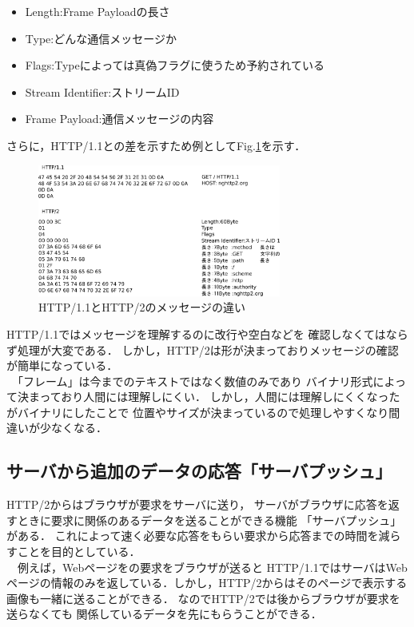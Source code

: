 \documentclass[a4j,9pt,twocolumn]{jsarticle}
\begin{document}
\begin{itemize}
 \item  Length:Frame Payloadの長さ
 \item Type:どんな通信メッセージか
 \item Flags:Typeによっては真偽フラグに使うため予約されている
 \item Stream Identifier:ストリームID
 \item Frame Payload:通信メッセージの内容
\end{itemize}

さらに，HTTP/1.1との差を示すため例としてFig.\ref{AHEAD}を示す．

\begin{figure}[h]
\centering
\includegraphics[width=80mm]{img/AHEAD2.eps}
\caption{HTTP/1.1とHTTP/2のメッセージの違い}
\label{AHEAD}
\end{figure}

HTTP/1.1ではメッセージを理解するのに改行や空白などを
確認しなくてはならず処理が大変である．
しかし，HTTP/2は形が決まっておりメッセージの確認が簡単になっている．
\\　「フレーム」は今までのテキストではなく数値のみであり
バイナリ形式によって決まっており人間には理解しにくい．
しかし，人間には理解しにくくなったがバイナリにしたことで
位置やサイズが決まっているので処理しやすくなり間違いが少なくなる．






\subsection{サーバから追加のデータの応答「サーバプッシュ」}
HTTP/2からはブラウザが要求をサーバに送り，
サーバがブラウザに応答を返すときに要求に関係のあるデータを送ることができる機能
「サーバプッシュ」がある．
これによって速く必要な応答をもらい要求から応答までの時間を減らすことを目的としている．
\\　例えば，Webページをの要求をブラウザが送ると
HTTP/1.1ではサーバはWebページの情報のみを返している．しかし，HTTP/2からはそのページで表示する画像も一緒に送ることができる．
なのでHTTP/2では後からブラウザが要求を送らなくても
関係しているデータを先にもらうことができる．
\end{document}
